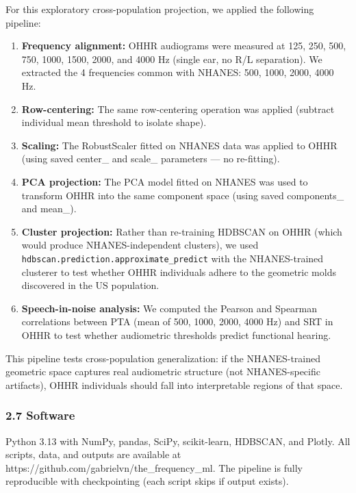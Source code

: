 \documentclass[
]{article}
\begin{document}
For this exploratory cross-population projection, we applied the following pipeline:

\begin{enumerate}
\def\labelenumi{\arabic{enumi}.}
\item
  \textbf{Frequency alignment:} OHHR audiograms were measured at 125, 250, 500,
  750, 1000, 1500, 2000, and 4000 Hz (single ear, no R/L separation). We
  extracted the 4 frequencies common with NHANES: 500, 1000, 2000, 4000 Hz.
\item
  \textbf{Row-centering:} The same row-centering operation was applied (subtract
  individual mean threshold to isolate shape).
\item
  \textbf{Scaling:} The RobustScaler fitted on NHANES data was applied to OHHR
  (using saved center\_ and scale\_ parameters --- no re-fitting).
\item
  \textbf{PCA projection:} The PCA model fitted on NHANES was used to transform
  OHHR into the same component space (using saved components\_ and mean\_).
\item
  \textbf{Cluster projection:} Rather than re-training HDBSCAN on OHHR (which
  would produce NHANES-independent clusters), we used
  \texttt{hdbscan.prediction.approximate\_predict} with the NHANES-trained
  clusterer to test whether OHHR individuals adhere to the geometric molds
  discovered in the US population.
\item
  \textbf{Speech-in-noise analysis:} We computed the Pearson and Spearman
  correlations between PTA (mean of 500, 1000, 2000, 4000 Hz) and SRT in OHHR to
  test whether audiometric thresholds predict functional hearing.
\end{enumerate}

This pipeline tests cross-population generalization: if the NHANES-trained
geometric space captures real audiometric structure (not NHANES-specific
artifacts), OHHR individuals should fall into interpretable regions of that
space.

\subsubsection{2.7 Software}\label{software}

Python 3.13 with NumPy, pandas, SciPy, scikit-learn, HDBSCAN, and Plotly. All
scripts, data, and outputs are available at
https://github.com/gabrielvn/the\_frequency\_ml. The pipeline is fully
reproducible with checkpointing (each script skips if output exists).
\end{document}
